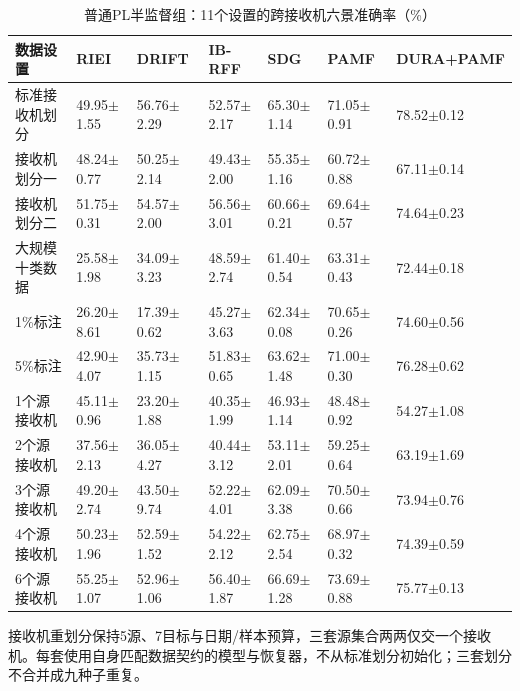 \documentclass[10pt,journal]{IEEEtran}
\begin{document}
\begin{table}[!tbp]
\caption{普通PL半监督组：11个设置的跨接收机六景准确率（\%）}
\label{tab:grouped-13}
\centering
\small
\begin{tabularx}{\textwidth}{YYYYYYY}
\toprule
\textbf{数据设置} & \textbf{RIEI} & \textbf{DRIFT} & \textbf{IB-RFF} & \textbf{SDG} & \textbf{PAMF} & \textbf{DURA+PAMF} \\
\midrule
标准接收机划分 & 49.95\ensuremath{\pm}1.55 & 56.76\ensuremath{\pm}2.29 & 52.57\ensuremath{\pm}2.17 & 65.30\ensuremath{\pm}1.14 & 71.05\ensuremath{\pm}0.91 & 78.52\ensuremath{\pm}0.12 \\
接收机划分一 & 48.24\ensuremath{\pm}0.77 & 50.25\ensuremath{\pm}2.14 & 49.43\ensuremath{\pm}2.00 & 55.35\ensuremath{\pm}1.16 & 60.72\ensuremath{\pm}0.88 & 67.11\ensuremath{\pm}0.14 \\
接收机划分二 & 51.75\ensuremath{\pm}0.31 & 54.57\ensuremath{\pm}2.00 & 56.56\ensuremath{\pm}3.01 & 60.66\ensuremath{\pm}0.21 & 69.64\ensuremath{\pm}0.57 & 74.64\ensuremath{\pm}0.23 \\
大规模十类数据 & 25.58\ensuremath{\pm}1.98 & 34.09\ensuremath{\pm}3.23 & 48.59\ensuremath{\pm}2.74 & 61.40\ensuremath{\pm}0.54 & 63.31\ensuremath{\pm}0.43 & 72.44\ensuremath{\pm}0.18 \\
1\%标注 & 26.20\ensuremath{\pm}8.61 & 17.39\ensuremath{\pm}0.62 & 45.27\ensuremath{\pm}3.63 & 62.34\ensuremath{\pm}0.08 & 70.65\ensuremath{\pm}0.26 & 74.60\ensuremath{\pm}0.56 \\
5\%标注 & 42.90\ensuremath{\pm}4.07 & 35.73\ensuremath{\pm}1.15 & 51.83\ensuremath{\pm}0.65 & 63.62\ensuremath{\pm}1.48 & 71.00\ensuremath{\pm}0.30 & 76.28\ensuremath{\pm}0.62 \\
1个源接收机 & 45.11\ensuremath{\pm}0.96 & 23.20\ensuremath{\pm}1.88 & 40.35\ensuremath{\pm}1.99 & 46.93\ensuremath{\pm}1.14 & 48.48\ensuremath{\pm}0.92 & 54.27\ensuremath{\pm}1.08 \\
2个源接收机 & 37.56\ensuremath{\pm}2.13 & 36.05\ensuremath{\pm}4.27 & 40.44\ensuremath{\pm}3.12 & 53.11\ensuremath{\pm}2.01 & 59.25\ensuremath{\pm}0.64 & 63.19\ensuremath{\pm}1.69 \\
3个源接收机 & 49.20\ensuremath{\pm}2.74 & 43.50\ensuremath{\pm}9.74 & 52.22\ensuremath{\pm}4.01 & 62.09\ensuremath{\pm}3.38 & 70.50\ensuremath{\pm}0.66 & 73.94\ensuremath{\pm}0.76 \\
4个源接收机 & 50.23\ensuremath{\pm}1.96 & 52.59\ensuremath{\pm}1.52 & 54.22\ensuremath{\pm}2.12 & 62.75\ensuremath{\pm}2.54 & 68.97\ensuremath{\pm}0.32 & 74.39\ensuremath{\pm}0.59 \\
6个源接收机 & 55.25\ensuremath{\pm}1.07 & 52.96\ensuremath{\pm}1.06 & 56.40\ensuremath{\pm}1.87 & 66.69\ensuremath{\pm}1.28 & 73.69\ensuremath{\pm}0.88 & 75.77\ensuremath{\pm}0.13 \\
\bottomrule
\end{tabularx}
\end{table}
接收机重划分保持5源、7目标与日期/样本预算，三套源集合两两仅交一个接收机。每套使用自身匹配数据契约的模型与恢复器，不从标准划分初始化；三套划分不合并成九种子重复。
\end{document}
